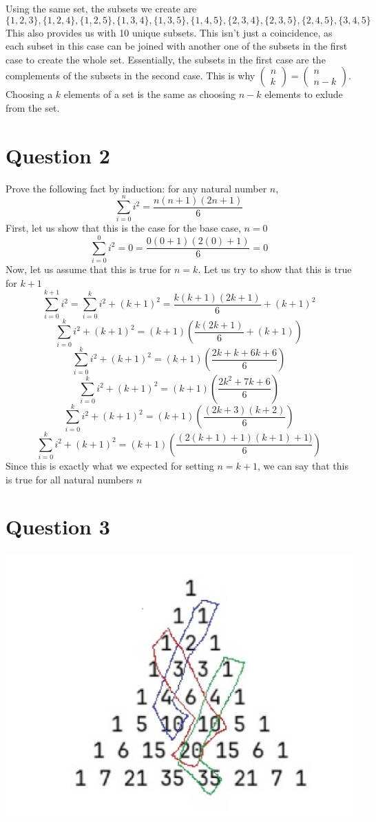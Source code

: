 \documentclass[hidelinks]{article}
\begin{document}
Using the same set, the subsets we create are 
\[
    \{1, 2, 3\}, \{1, 2, 4\}, \{1, 2, 5\}, \{1, 3, 4\}, \{1, 3, 5\}, \{1, 4, 5\}, \{2, 3, 4\}, \{2, 3, 5\}, \{2, 4, 5\}, \{3, 4, 5\}
\]
This also provides us with 10 unique subsets. This isn't just a coincidence, as each subset in this case can be joined with another one of the subsets in the first case to create the whole set. Essentially, the subsets in the first case are the complements of the subsets in the second case. This is why $\begin{pmatrix}n \\ k \end{pmatrix} = \begin{pmatrix}n \\ n-k \end{pmatrix}$. Choosing a $k$ elements of a set is the same as choosing $n - k$ elements to exlude from the set.
\newpage
\section*{Question 2}
Prove the following fact by induction: for any natural number $n$, 
\[
    \sum_{i=0}^{n} i^2 = \frac{n(n+1)(2n+1)}{6}
\]
First, let us show that this is the case for the base case, $n = 0$
\[
    \sum_{i=0}^{0} i^2 = 0 = \frac{0(0+1)(2(0)+1)}{6} = 0
\]
Now, let us assume that this is true for $n = k$. Let us try to show that this is true for $k+1$ 
\[ 
    \sum_{i=0}^{k+1} i^2  = \sum_{i=0}^{k} i^2 + (k+1)^2 = \frac{k(k+1)(2k+1)}{6} + (k+1)^2
\]
\[
    \sum_{i=0}^{k} i^2 + (k+1)^2  = (k+1)\left (\frac{k(2k+1)}{6} + (k+1)\right)
\]
\[
    \sum_{i=0}^{k} i^2 + (k+1)^2  = (k+1)\left (\frac{2k+k+6k+6}{6} \right)
\]
\[
    \sum_{i=0}^{k} i^2 + (k+1)^2  = (k+1)\left (\frac{2k^2+7k+6}{6} \right)
\]
\[
    \sum_{i=0}^{k} i^2 + (k+1)^2  = (k+1)\left (\frac{(2k+3)(k+2)}{6} \right)
\]
\[
    \sum_{i=0}^{k} i^2 + (k+1)^2  = (k+1)\left (\frac{(2(k+1) + 1)(k+1) + 1)}{6} \right)
\]
Since this is exactly what we expected for setting $n=k+1$, we can say that this is true for all natural numbers $n$
\newpage
\section*{Question 3}

\includegraphics[scale=0.75]{pascal}
\end{document}

